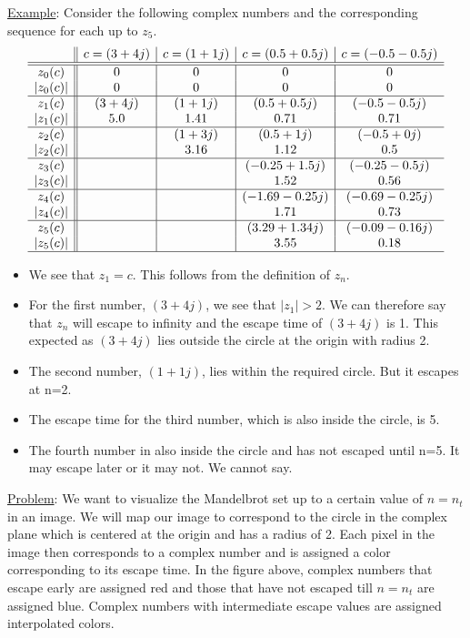\documentclass[addpoints]{exam}
\begin{document}
\begin{questions}
  \underline{Example}: Consider the following complex numbers and the corresponding sequence for each up to $z_5$.
  \[
    \begin{array}{c|*{4}{|c}}
      & c=(3+4j) & c=(1+1j) & c=(0.5+0.5j) & c=(-0.5-0.5j)\\\hline\hline
      z_0(c) & 0 & 0 & 0 & 0\\
      |z_0(c)| & 0 & 0 & 0 & 0\\\hline
      z_1(c) & (3+4j) & (1+1j) & (0.5+0.5j) & (-0.5-0.5j)\\
      |z_1(c)| & 5.0 & 1.41 & 0.71 & 0.71\\\hline
      z_2(c) &  & (1+3j) & (0.5+1j) & (-0.5+0j)\\
      |z_2(c)| &  & 3.16 & 1.12 & 0.5\\\hline
      z_3(c) &  &  & (-0.25+1.5j) & (-0.25-0.5j)\\
      |z_3(c)| &  &  & 1.52 & 0.56\\\hline
      z_4(c) &  &  & (-1.69-0.25j) & (-0.69-0.25j)\\
      |z_4(c)| &  &  & 1.71 & 0.73\\\hline
      z_5(c) &  &  & (3.29+1.34j) & (-0.09-0.16j)\\
      |z_5(c)| &  &  & 3.55 & 0.18\\\hline
    \end{array}
  \]

  \begin{itemize}
  \item We see that $z_1=c$. This follows from the definition of $z_n$.
  \item For the first number, $(3+4j)$, we see that $|z_1|>2$. We can therefore say that $z_n$ will escape to infinity and the escape time of $(3+4j)$ is 1. This expected as $(3+4j)$ lies outside the circle at the origin with radius 2.
  \item The second number, $(1+1j)$, lies within the required circle. But it escapes at n=2.
  \item The escape time for the third number, which is also inside the circle, is 5.
  \item The fourth number in also inside the circle and has not escaped until n=5. It may escape later or it may not. We cannot say.
  \end{itemize}
  
  \underline{Problem}: We want to visualize the Mandelbrot set up to a certain value of $n=n_t$ in an image. We will map our image to correspond to the circle in the complex plane which is centered at the origin and has a radius of 2. Each pixel in the image then corresponds to a complex number and is assigned a color corresponding to its escape time. In the figure above, complex numbers that escape early are assigned red and those that have not escaped till $n=n_t$ are assigned blue. Complex numbers with intermediate escape values are assigned interpolated colors. 


\end{questions}
\end{document}
